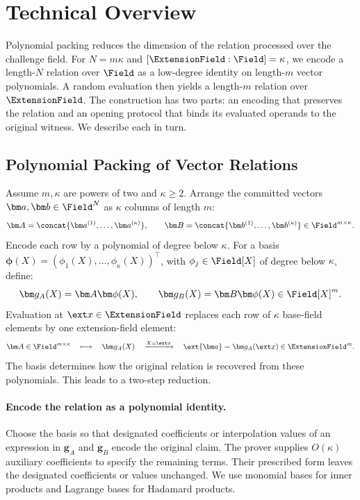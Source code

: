 \section{Technical Overview}
\label{sec:overview}

Polynomial packing reduces the dimension of the relation processed
over the challenge field. For \(N=m\kappa\) and
\([\ExtensionField:\Field]=\kappa\), we encode a length-\(N\)
relation over \(\Field\) as a low-degree identity on length-\(m\)
vector polynomials. A random evaluation then yields a length-\(m\)
relation over \(\ExtensionField\).
The construction has two parts: an encoding that preserves the
relation and an opening protocol that binds its evaluated operands
to the original witness. We describe each in turn.

\subsection{Polynomial Packing of Vector Relations}
\label{sec:dualPhase}

Assume \(m,\kappa\) are powers of two and \(\kappa\geq2\).
Arrange the committed vectors \(\bm a,\bm b\in\Field^N\) as
\(\kappa\) columns of length \(m\):
\[
    \bm A=\concat{\bm a^{(1)},\ldots,\bm a^{(\kappa)}},
    \qquad
    \bm B=\concat{\bm b^{(1)},\ldots,\bm b^{(\kappa)}}
    \in\Field^{m\times\kappa}.
\]
Encode each row by a polynomial of degree below \(\kappa\).
For a basis
\(\bm\phi(X)=(\phi_1(X),\ldots,\phi_\kappa(X))^\top\), with
\(\phi_j\in\Field[X]\) of degree below \(\kappa\), define:
\begin{equation}
    \bm g_A(X)=\bm A\bm\phi(X),
    \qquad
    \bm g_B(X)=\bm B\bm\phi(X)
    \in\Field[X]^m.
\label{eq:overview-packing}
\end{equation}
Evaluation at \(\ext x\in\ExtensionField\) replaces each row of
\(\kappa\) base-field elements by one extension-field element:
\[
    \bm A\in\Field^{m\times\kappa}
    \quad\longmapsto\quad
    \bm g_A(X)
    \quad\xrightarrow{X=\ext x}\quad
    \ext{\bm a}=\bm g_A(\ext x)\in\ExtensionField^m.
\]
The basis determines how the original relation is recovered from
these polynomials. This leads to a two-step reduction.

\paragraph{Encode the relation as a polynomial identity.}
Choose the basis so that designated coefficients or interpolation
values of an expression in \(\bm g_A\) and \(\bm g_B\) encode
the original claim.
The prover supplies \(O(\kappa)\) auxiliary coefficients to specify
the remaining terms. Their prescribed form leaves the designated
coefficients or values unchanged.
We use monomial bases for inner products and Lagrange bases for
Hadamard products.

